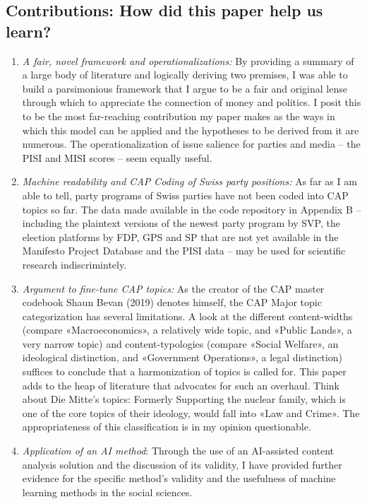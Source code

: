 \documentclass[11pt,a4paper]{article}
\begin{document}
\subsection{Contributions: How did this paper help us learn?}
\begin{enumerate}
    \item  \textit{A fair, novel framework and operationalizations:} By providing a summary of a large body of literature and logically deriving two premises, I was able to build a parsimonious framework that I argue to be a fair and original lense through which to appreciate the connection of money and politics. I posit this to be the most far-reaching contribution my paper makes as the ways in which this model can be applied and the hypotheses to be derived from it are numerous. The operationalization of issue salience for parties and media – the PISI and MISI scores – seem equally useful.

    \item \textit{Machine readability and CAP Coding of Swiss party positions:} As far as I am able to tell, party programs of Swiss parties have not been coded into CAP topics so far. The data made available in the code repository in Appendix B – including the plaintext versions of the newest party program by SVP, the election platforms by FDP, GPS and SP that are not yet available in the Manifesto Project Database and the PISI data – may be used for scientific research indiscrimintely. 

    \item \textit{Argument to fine-tune CAP topics:} As the creator of the CAP master codebook Shaun Bevan (2019) denotes himself, the CAP Major topic categorization has several limitations. A look at the different content-widths (compare «Macroeconomics», a relatively wide topic, and «Public Lands», a very narrow topic) and content-typologies (compare «Social Welfare», an ideological distinction, and «Government Operations», a legal distinction) suffices to conclude that a harmonization of topics is called for. This paper adds to the heap of literature that advocates for such an overhaul. Think about Die Mitte’s topics: Formerly Supporting the nuclear family, which is one of the core topics of their ideology, would fall into «Law and Crime». The appropriateness of this classification is in my opinion questionable. 

    \item \textit{Application of an AI method}: Through the use of an AI-assisted content analysis solution and the discussion of its validity, I have provided further evidence for the specific method’s validity and the usefulness of machine learning methods in the social sciences.


\end{enumerate}
\end{document}
